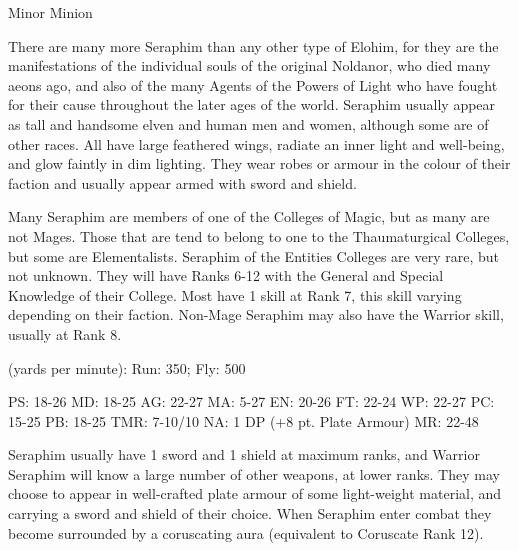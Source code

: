\begin{Description}

\item[Class] Minor Minion

\item[Description] There are many more Seraphim than any other type of
  Elohim, for they are the manifestations of the individual souls of
  the original Noldanor, who died many aeons ago, and also of the many
  Agents of the Powers of Light who have fought for their cause
  throughout the later ages of the world. Seraphim usually appear as
  tall and handsome elven and human men and women, although some are
  of other races. All have large feathered wings, radiate an inner
  light and well-being, and glow faintly in dim lighting. They wear
  robes or armour in the colour of their faction and usually appear
  armed with sword and shield.

\item[Talents, Skills and Magic] Many Seraphim are members of one of
  the Colleges of Magic, but as many are not Mages. Those that are
  tend to belong to one to the Thaumaturgical Colleges, but some are
  Elementalists. Seraphim of the Entities Colleges are very rare, but
  not unknown. They will have Ranks 6-12 with the General and Special
  Knowledge of their College. Most have 1 skill at Rank 7, this skill
  varying depending on their faction. Non-Mage Seraphim may also have
  the Warrior skill, usually at Rank 8.

\item[Movement Rates] (yards per minute): Run: 350; Fly: 500

PS: 18-26		MD: 18-25	AG: 22-27	MA: 5-27
EN: 20-26	FT: 22-24	WP: 22-27	PC: 15-25
PB: 18-25	TMR: 7-10/10	NA: 1 DP (+8 pt. Plate Armour)
MR: 22-48

\item[Weapons] Seraphim usually have 1 sword and 1 shield at maximum
  ranks, and Warrior Seraphim will know a large number of other
  weapons, at lower ranks. They may choose to appear in well-crafted
  plate armour of some light-weight material, and carrying a sword and
  shield of their choice. When Seraphim enter combat they become
  surrounded by a coruscating aura (equivalent to Coruscate Rank 12).
\end{Description}

